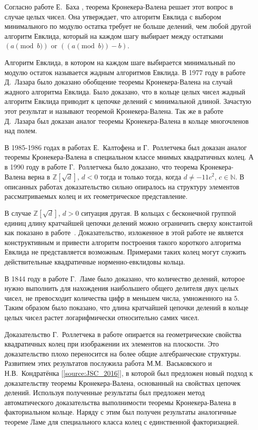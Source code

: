 \documentclass[_00_dissertation.tex]{subfiles}
\begin{document}
Согласно работе Е.~Баха \cite{source:Bach_Algorithmic_number_theory}, теорема Кронекера-Валена решает этот вопрос в случае целых чисел.
Она утверждает, что алгоритм Евклида с выбором минимального по модулю остатка требует не больше делений, чем любой другой алгоритм Евклида, который на каждом шагу выбирает между остатками $(a\pmod{b})$ or $((a\pmod{b})-b)$.

Алгоритм Евклида, в котором на каждом шаге выбирается минимальный по модулю остаток называется жадным алгоритмов Евклида.
В 1977 году в работе Д.~Лазара \cite{source:Lazard} было доказано обобщение теоремы Кронекера-Валена на случай жадного алгоритма Евклида.
Было доказано, что в кольце целых чисел жадный алгоритм Евклида приводит к цепочке делений с минимальной длиной.
Зачастую этот результат и называют теоремой Кронекера-Валена.
Так же в работе Д.~Лазара был доказан аналог теоремы Кронекера-Валена в кольце многочленов над полем.

В 1985-1986 годах в работах Е.~Калтофена и Г.~Роллетчека \cite{source:Kaltofen, source:Rolletschek_1986} был доказан аналог теоремы Кронекера-Валена в специальном классе мнимых квадратичных колец.
А в 1990 году в работе Г.~Роллетчека \cite{source:Rolletschek_1990} было доказано, что теорема Кронекера-Валена верна в $\mathbb{Z}[\sqrt{d}]$, $d < 0$ тогда и только тогда, когда $d\neq-11c^{2}$, $c\in\mathbb{N}$.
В описанных работах доказательство сильно опиралось на структуру элементов рассматриваемых колец и их геометрическое представление.

В случае $\mathbb{Z}[\sqrt{d}]$, $d > 0$ ситуация другая.
В кольцах с бесконечной группой единиц длину кратчайшей цепочки делений можно ограничить сверху константой как показано в работе~\cite{source:Cooke}.
Доказательство, изложенное в этой работе не является конструктивным и привести алгоритм построения такого короткого алгоритма Евклида не представляется возможным.
Примерами таких колец могут служить действительные квадратичные норменно-евклидовы кольца.

В 1844 году в работе Г.~Ламе было доказано, что количество делений, которое нужно выполнить для нахождения наибольшего общего делителя двух целых чисел, не превосходит количества цифр в меньшем числа, умноженного на $5$.
Таким образом было показано, что длина кратчайшей цепочки делений в кольце целых чисел растет логарифмически относительно самих чисел.

Доказательство Г.~Роллетчека в работе \cite{source:Rolletschek_1990} опирается на геометрические свойства квадратичных колец при изображении их элементов на плоскости.
Это доказательство плохо переносится на более общие алгебраические структуры.
Развитием этих результатов послужила работа М.М.~Васьковского и Н.В.~Кондратёнка [\ref{source:JSC_2016}], в которой был предложен новый подход к доказательству теоремы Кронекера-Валена, основанный на свойствах цепочек делений.
Используя полученные результаты был предложен метод автоматического доказательства выполнимости теоремы Кронекера-Валена в факториальном кольце.
Наряду с этим был получен результаты аналогичные теореме Ламе для специального класса колец с единственной факторизацией.
\end{document}

